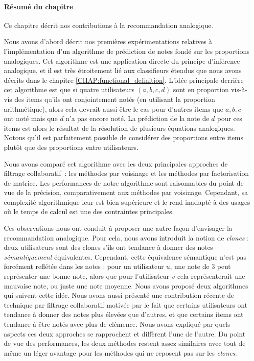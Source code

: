 \paragraph{Résumé du chapitre}

Ce chapitre décrit nos contributions à la recommandation analogique.

Nous avons d'abord décrit nos premières expérimentations relatives  à
l'implémentation d'un algorithme de prédiction de notes fondé sur les
proportions analogiques. Cet algorithme est une application directe du principe
d'inférence analogique, et il est très étroitement lié aux classifieurs étendus
que nous avons décrits dans le chapitre \ref{CHAP:functional_definition}.
L'idée principale derrière cet algorithme est que si quatre utilisateurs $(a,
b, c, d)$ sont en proportion vis-à-vis des items qu'ils ont conjointement notés
(en utilisant la proportion arithmétique), alors cela devrait aussi être le cas
pour d'autres items que $a, b, c$ ont noté mais que $d$ n'a pas encore noté. La
prédiction de la note de $d$ pour ces items est alors le résultat de la
résolution de plusieurs équations analogiques. Notons qu'il est parfaitement
possible de considérer des proportions entre items plutôt que des proportions
entre utilisateurs.

Nous avons comparé cet algorithme avec les deux principales approches de
filtrage collaboratif~: les méthodes par voisinage et les méthodes par
factorisation de matrice. Les performances de notre algorithme sont
raisonnables du point de vue de la précision, comparativement aux méthodes par
voisinage.  Cependant, sa complexité algorithmique leur est bien supérieure et
le rend inadapté à des usages où le temps de calcul est une des contraintes
principales.

Ces observations nous ont conduit à proposer une autre façon d'envisager la
recommandation analogique. Pour cela, nous avons introduit la notion de
\textit{clones} : deux utilisateurs sont des clones s'ils ont tendance à donner
des notes \textit{sémantiquement} équivalentes. Cependant, cette équivalence
sémantique n'est pas forcément reflétée dans les notes : pour un utilisateur
$u$, une note  de $3$ peut représenter une bonne note, alors que pour
l'utilisateur $v$ cela représenterait une mauvaise note, ou juste une note
moyenne. Nous avons proposé deux algorithmes qui suivent cette idée. Nous avons
aussi présenté une contribution récente de technique par filtrage collaboratif
motivée par le fait que certains utilisateurs ont tendance à donner des notes
plus élevées que d'autres, et que certains items ont tendance à être notés avec
plus de clémence. Nous avons expliqué par quels aspects ces deux approches se
rapprochent et diffèrent l'une de l'autre. Du point de vue des performances,
les deux méthodes restent assez similaires avec tout de même un léger avantage
pour les méthodes qui ne reposent pas sur les \textit{clones}.


